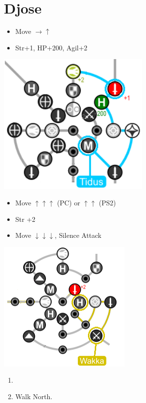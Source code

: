 \chapter{Djose}

\begin{spheregrid}
  \begin{itemize}
    \tidusf
    \begin{itemize}
      \item Move $\rightarrow\uparrow$
      \item Str+1, HP+200, Agil+2
    \end{itemize}
    \includegraphics{graphics/djosetidus}
    \wakkaf
    \begin{itemize}
      \item Move $\uparrow\uparrow\uparrow$ (PC) or $\uparrow\uparrow$ (PS2)
      \item Str +2
      \item Move $\downarrow\downarrow\downarrow$, Silence Attack
    \end{itemize}
    \includegraphics{graphics/djosewakka}
  \end{itemize}
\end{spheregrid}
\begin{enumerate}
  \item \formation{\tidus}{\yuna}{\auron}
  \item Walk North.
\end{enumerate}

